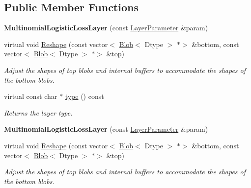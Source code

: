 \subsection*{Public Member Functions}
\begin{DoxyCompactItemize}
\item 
\mbox{\label{classcaffe_1_1_multinomial_logistic_loss_layer_a1c9567f9901885ec4737cf9315d52081}} 
{\bfseries Multinomial\+Logistic\+Loss\+Layer} (const \mbox{\hyperlink{classcaffe_1_1_layer_parameter}{Layer\+Parameter}} \&param)
\item 
virtual void \mbox{\hyperlink{classcaffe_1_1_multinomial_logistic_loss_layer_a979be47987712c02dfb57a88b2a69f11}{Reshape}} (const vector$<$ \mbox{\hyperlink{classcaffe_1_1_blob}{Blob}}$<$ Dtype $>$ $\ast$$>$ \&bottom, const vector$<$ \mbox{\hyperlink{classcaffe_1_1_blob}{Blob}}$<$ Dtype $>$ $\ast$$>$ \&top)
\begin{DoxyCompactList}\small\item\em Adjust the shapes of top blobs and internal buffers to accommodate the shapes of the bottom blobs. \end{DoxyCompactList}\item 
\mbox{\label{classcaffe_1_1_multinomial_logistic_loss_layer_a024d90a0acee12dbec6c640fe709d5ea}} 
virtual const char $\ast$ \mbox{\hyperlink{classcaffe_1_1_multinomial_logistic_loss_layer_a024d90a0acee12dbec6c640fe709d5ea}{type}} () const
\begin{DoxyCompactList}\small\item\em Returns the layer type. \end{DoxyCompactList}\item 
\mbox{\label{classcaffe_1_1_multinomial_logistic_loss_layer_a1c9567f9901885ec4737cf9315d52081}} 
{\bfseries Multinomial\+Logistic\+Loss\+Layer} (const \mbox{\hyperlink{classcaffe_1_1_layer_parameter}{Layer\+Parameter}} \&param)
\item 
virtual void \mbox{\hyperlink{classcaffe_1_1_multinomial_logistic_loss_layer_afd5162d1fc8be1a4abdf1afaa96519f8}{Reshape}} (const vector$<$ \mbox{\hyperlink{classcaffe_1_1_blob}{Blob}}$<$ Dtype $>$ $\ast$$>$ \&bottom, const vector$<$ \mbox{\hyperlink{classcaffe_1_1_blob}{Blob}}$<$ Dtype $>$ $\ast$$>$ \&top)
\begin{DoxyCompactList}\small\item\em Adjust the shapes of top blobs and internal buffers to accommodate the shapes of the bottom blobs. \end{DoxyCompactList}\item 

\end{DoxyCompactItemize}

